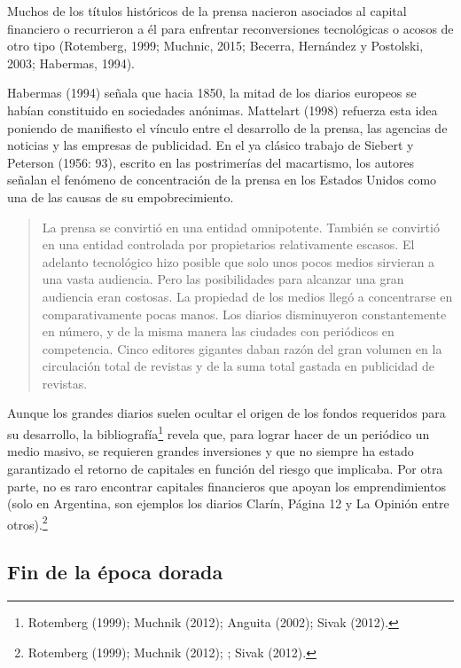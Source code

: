 Muchos de los títulos históricos de la prensa nacieron asociados al capital financiero o recurrieron a él para enfrentar reconversiones tecnológicas o acosos de otro tipo (Rotemberg, 1999; Muchnic, 2015; Becerra, Hernández y Postolski, 2003; Habermas, 1994).

Habermas (1994) señala que hacia 1850, la mitad de los diarios europeos se habían constituido en sociedades anónimas. Mattelart (1998) refuerza esta idea poniendo de manifiesto el vínculo entre el desarrollo de la prensa, las agencias de noticias y las empresas de publicidad. En el ya clásico trabajo de Siebert y Peterson (1956: 93), escrito en las postrimerías del macartismo, los autores señalan el fenómeno de concentración de la prensa en los Estados Unidos como una de las causas de su empobrecimiento.

\begin{quote}
	La prensa se convirtió en una entidad omnipotente. También se convirtió en una entidad controlada por propietarios relativamente escasos. El adelanto tecnológico hizo posible que solo unos pocos medios sirvieran a una vasta audiencia. Pero las posibilidades para alcanzar una gran audiencia eran costosas. La propiedad de los medios llegó a concentrarse en comparativamente pocas manos. Los diarios disminuyeron constantemente en número, y de la misma manera las ciudades con periódicos en competencia. Cinco editores gigantes daban razón del gran volumen en la circulación total de revistas y de la suma total gastada en publicidad de revistas.
\end{quote}


Aunque los grandes diarios suelen ocultar el origen de los fondos requeridos para su desarrollo, la bibliografía\footnote{Rotemberg  (1999); Muchnik (2012); Anguita (2002); Sivak (2012).} revela que, para lograr hacer de un periódico un medio masivo, se requieren grandes inversiones y que no siempre ha estado garantizado el retorno de capitales en función del riesgo que implicaba. Por otra parte, no es raro encontrar capitales financieros que apoyan los emprendimientos (solo en Argentina, son ejemplos los diarios Clarín, Página 12 y La Opinión entre otros).\footnote{Rotemberg  (1999); Muchnik (2012); \textcite{@6963-ANGUITA2002}; Sivak (2012).}

\subsection {Fin de la época dorada}

